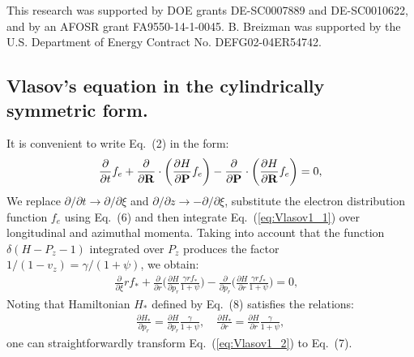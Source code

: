 \documentclass[twocolumn,showpacs,aip]{revtex4}
\begin{document}
This research was supported by DOE grants DE-SC0007889 and DE-SC0010622, and by an AFOSR grant FA9550-14-1-0045. B. Breizman was  supported by the U.S. Department of Energy Contract
No. DEFG02-04ER54742.


\begin{appendix}
\section{Vlasov's equation in the cylindrically symmetric form.}
 It is convenient to write Eq.~(2)  in the form: 
\begin{eqnarray}
\frac{\partial }{\partial t}{f_e} +\frac{\partial}{\partial {\bf{R}}}\cdot\bigg(\frac{\partial H}{\partial {\bf{P}}} f_e\bigg)-
\frac{\partial }{\partial {\bf{P}}}
\cdot\bigg(\frac{\partial H}{\partial {\bf{R}}}f_e\bigg)=0,
\label{eq:Vlasov1_1}
\end{eqnarray}
We replace $\partial  /\partial t\rightarrow \partial  /\partial \xi$ and $\partial  /\partial z\rightarrow -\partial  /\partial \xi$,  substitute the electron distribution function $f_e$ using Eq.~(6) and then integrate Eq.~(\ref{eq:Vlasov1_1}) over longitudinal and azimuthal momenta. Taking into account that  the function $\delta(H-P_z-1)$  integrated  over $P_z$  produces the factor $1/(1-v_z)=\gamma/(1+\psi)$, we obtain:
\begin{eqnarray}
\frac{\partial }{\partial \xi}{r f_*}+\frac{\partial}{\partial {r}}\bigg(\frac{\partial H}{\partial {p_r}}\frac{\gamma rf_*}{1+\psi}\bigg)-
\frac{\partial }{\partial {p_r}}
\bigg(\frac{\partial H}{\partial {r}}\frac{\gamma rf_*}{1+\psi}\bigg)=0,\,\,\,\,
\label{eq:Vlasov1_2}
\end{eqnarray}
Noting that Hamiltonian $H_*$ defined by Eq.~(8) satisfies the relations:
\begin{eqnarray}
\frac{\partial H_*}{\partial {p_r}}=\frac{\partial H}{\partial {p_r}}\frac{\gamma }{1+\psi},\quad
\frac{\partial H_*}{\partial {r}}=\frac{\partial H}{\partial {r}}\frac{\gamma }{1+\psi},
\label{eq:Vlasov1_3}
\end{eqnarray}
one can straightforwardly transform Eq.~(\ref{eq:Vlasov1_2}) to Eq.~(7).

\end{appendix}
\end{document}

